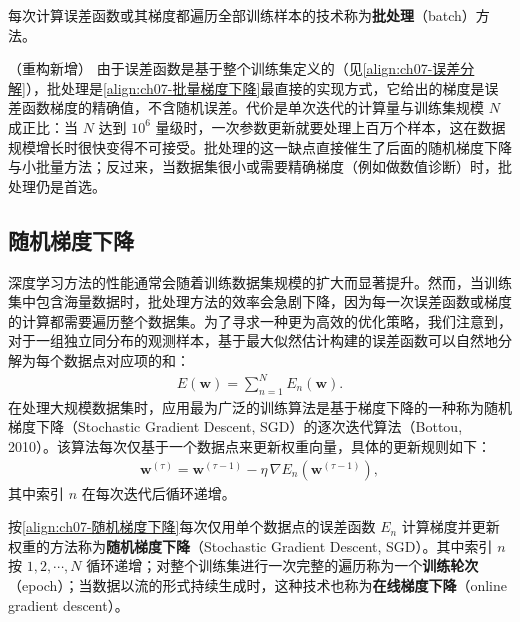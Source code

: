 \documentclass[../../main.tex]{subfiles}
\begin{document}
\begin{definition}[批处理方法]\label{definition:ch07-批处理}
每次计算误差函数或其梯度都遍历全部训练样本的技术称为\textbf{批处理}（batch）方法。
\end{definition}

\begin{remark}（重构新增）
由于误差函数是基于整个训练集定义的（见\eqref{align:ch07-误差分解}），批处理是\eqref{align:ch07-批量梯度下降}最直接的实现方式，它给出的梯度是误差函数梯度的精确值，不含随机误差。代价是单次迭代的计算量与训练集规模 $N$ 成正比：当 $N$ 达到 $10^{6}$ 量级时，一次参数更新就要处理上百万个样本，这在数据规模增长时很快变得不可接受。批处理的这一缺点直接催生了后面的随机梯度下降与小批量方法；反过来，当数据集很小或需要精确梯度（例如做数值诊断）时，批处理仍是首选。
\end{remark}

\subsection{随机梯度下降}\label{subsection:ch07-随机梯度下降}

深度学习方法的性能通常会随着训练数据集规模的扩大而显著提升。然而，当训练集中包含海量数据时，批处理方法的效率会急剧下降，因为每一次误差函数或梯度的计算都需要遍历整个数据集。为了寻求一种更为高效的优化策略，我们注意到，对于一组独立同分布的观测样本，基于最大似然估计构建的误差函数可以自然地分解为每个数据点对应项的和：
\begin{align}
E(\mathbf{w}) = \sum_{n=1}^{N}E_n(\mathbf{w}).
\label{align:ch07-误差分解}
\end{align}
在处理大规模数据集时，应用最为广泛的训练算法是基于梯度下降的一种称为随机梯度下降（Stochastic Gradient Descent, SGD）的逐次迭代算法（Bottou, 2010）。该算法每次仅基于一个数据点来更新权重向量，具体的更新规则如下：
\begin{align}
\mathbf{w}^{(\tau)} = \mathbf{w}^{(\tau-1)}-\eta\,\nabla E_n(\mathbf{w}^{(\tau-1)}),
\label{align:ch07-随机梯度下降}
\end{align}
其中索引 $n$ 在每次迭代后循环递增。

\begin{definition}[随机梯度下降]\label{definition:ch07-随机梯度下降}
按\eqref{align:ch07-随机梯度下降}每次仅用单个数据点的误差函数 $E_n$ 计算梯度并更新权重的方法称为\textbf{随机梯度下降}（Stochastic Gradient Descent, SGD）。其中索引 $n$ 按 $1,2,\cdots,N$ 循环递增；对整个训练集进行一次完整的遍历称为一个\textbf{训练轮次}（epoch）；当数据以流的形式持续生成时，这种技术也称为\textbf{在线梯度下降}（online gradient descent）。
\end{definition}
\end{document}
